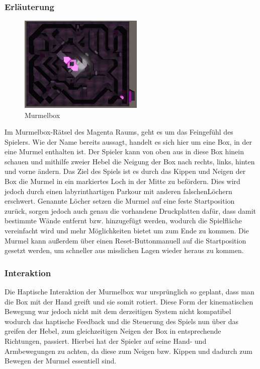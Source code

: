 \subsubsection{Erläuterung}
\begin{figure}
	\vspace*{-0.5cm}
	\includegraphics[width=5.9cm]{Pictures/Murmelbox}
	\caption{Murmelbox}
	\vspace*{-0.5cm}
	\label{fig:murmelbox}
\end{figure}
Im Murmelbox-Rätsel des Magenta Raums, geht es um das Feingefühl des Spielers. Wie der Name bereits aussagt, handelt es sich hier um eine Box, in der eine Murmel enthalten ist. Der Spieler kann von oben aus in diese Box hinein schauen und mithilfe zweier Hebel die Neigung der Box nach rechts, links, hinten und vorne ändern. Das Ziel des Spiels ist es durch das Kippen und Neigen der Box die Murmel in ein markiertes Loch in der Mitte zu befördern. Dies wird jedoch durch einen labyrinthartigen Parkour mit anderen \dq falschen\dq Löchern erschwert. Genannte Löcher setzen die Murmel auf eine feste Startposition zurück, sorgen jedoch auch genau die vorhandene Druckplatten dafür, dass damit bestimmte Wände entfernt bzw. hinzugefügt werden, wodurch die Spielfläche vereinfacht wird und mehr Möglichkeiten bietet um zum Ende zu kommen. Die Murmel kann außerdem über einen \dq Reset-Button\dq manuell auf die Startposition gesetzt werden, um schneller aus misslichen Lagen wieder heraus zu kommen.


\subsubsection{Interaktion}
\noindent Die Haptische Interaktion der Murmelbox war ursprünglich so geplant, dass man die Box mit der Hand greift und sie somit rotiert. Diese Form der kinematischen Bewegung war jedoch nicht mit dem derzeitigen System nicht kompatibel wodurch das haptische Feedback und die Steuerung des Spiels nun über das greifen der Hebel, zum gleichzeitigen Neigen der Box in entsprechende Richtungen, passiert. Hierbei hat der Spieler auf seine Hand- und Armbewegungen zu achten, da diese zum Neigen bzw. Kippen und dadurch zum Bewegen der Murmel essentiell sind.\\


